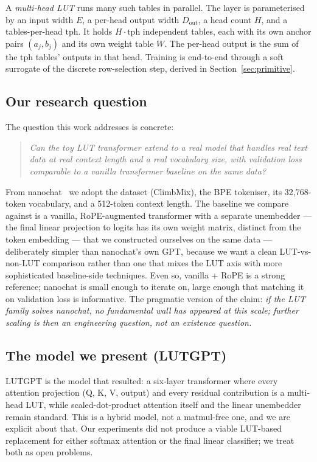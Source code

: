 \documentclass[11pt]{article}
\newcommand{\dout}{D_{\mathrm{out}}}
\begin{document}
A \emph{multi-head LUT} runs many such tables in parallel. The layer is parameterised by an input width $E$, a per-head output width $\dout$, a head count $H$, and a tables-per-head $\mathrm{tph}$. It holds $H \cdot \mathrm{tph}$ independent tables, each with its own anchor pairs $(a_j, b_j)$ and its own weight table $W$. The per-head output is the sum of the $\mathrm{tph}$ tables' outputs in that head. Training is end-to-end through a soft surrogate of the discrete row-selection step, derived in Section~\ref{sec:primitive}.

\subsection{Our research question}

The question this work addresses is concrete:

\begin{quote}
\itshape Can the toy LUT transformer extend to a real model that handles real text data at real context length and a real vocabulary size, with validation loss comparable to a vanilla transformer baseline on the same data?
\end{quote}

From nanochat~\citep{karpathy_nanochat} we adopt the dataset (ClimbMix), the BPE tokeniser, its 32{,}768-token vocabulary, and a 512-token context length. The baseline we compare against is a vanilla, RoPE-augmented transformer with a separate unembedder --- the final linear projection to logits has its own weight matrix, distinct from the token embedding --- that we constructed ourselves on the same data --- deliberately simpler than nanochat's own GPT, because we want a clean LUT-vs-non-LUT comparison rather than one that mixes the LUT axis with more sophisticated baseline-side techniques. Even so, vanilla + RoPE is a strong reference; nanochat is small enough to iterate on, large enough that matching it on validation loss is informative. The pragmatic version of the claim: \emph{if the LUT family solves nanochat, no fundamental wall has appeared at this scale; further scaling is then an engineering question, not an existence question.}

\subsection{The model we present (LUTGPT)}

LUTGPT is the model that resulted: a six-layer transformer where every attention projection (Q, K, V, output) and every residual contribution is a multi-head LUT, while scaled-dot-product attention itself and the linear unembedder remain standard. This is a hybrid model, not a matmul-free one, and we are explicit about that. Our experiments did not produce a viable LUT-based replacement for either softmax attention or the final linear classifier; we treat both as open problems.
\end{document}
